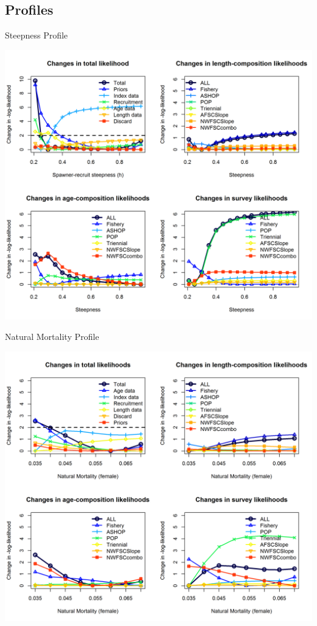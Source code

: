\documentclass[pdf]{beamer}\usepackage[]{graphicx}\usepackage[]{color}
\begin{document}
\subsection{Profiles}
\begin{frame}{Steepness Profile}
  \begin{center}
    \includegraphics[scale = 0.40]{figures/piner_panel_h.png}
  \end{center}
\end{frame}

\begin{frame}{Natural Mortality Profile}
  \begin{center}
    \includegraphics[scale = 0.40]{figures/piner_panel_m.png}
  \end{center}
\end{frame}
\end{document}

